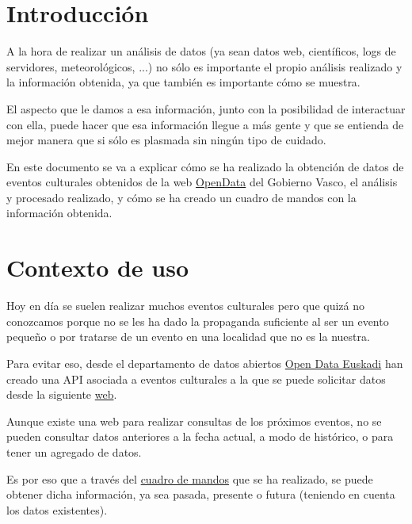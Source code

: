 \documentclass{\ClassPath/viu-tfm-template}
\begin{document}
    \graphicspath{{../../VIU_TFM_LaTeX_template/}}

    \coverpage

    \tableofcontents

\chapter{Introducción}

A la hora de realizar un análisis de datos (ya sean datos web, científicos, logs de servidores, meteorológicos, ...) no sólo es importante el propio análisis realizado y la información obtenida, ya que también es importante cómo se muestra.

El aspecto que le damos a esa información, junto con la posibilidad de interactuar con ella, puede hacer que esa información llegue a más gente y que se entienda de mejor manera que si sólo es plasmada sin ningún tipo de cuidado.

En este documento se va a explicar cómo se ha realizado la obtención de datos de eventos culturales obtenidos de la web \href{https://www.opendata.euskadi.eus/inicio/}{OpenData} del Gobierno Vasco, el análisis y procesado realizado, y cómo se ha creado un cuadro de mandos con la información obtenida.

\chapter{Contexto de uso}

Hoy en día se suelen realizar muchos eventos culturales pero que quizá no conozcamos porque no se les ha dado la propaganda suficiente al ser un evento pequeño o por tratarse de un evento en una localidad que no es la nuestra.

Para evitar eso, desde el departamento de datos abiertos \href{https://www.opendata.euskadi.eus/inicio/}{Open Data Euskadi} han creado una API asociada a eventos culturales a la que se puede solicitar datos desde la siguiente \href{https://www.opendata.euskadi.eus/api-culture/?api=culture_events}{web}.

Aunque existe una web para realizar consultas de los próximos eventos, no se pueden consultar datos anteriores a la fecha actual, a modo de histórico, o para tener un agregado de datos.

Es por eso que a través del \href{https://datastudio.google.com/reporting/2322c44e-ad75-4243-a4a5-257be6d754bf/page/9AT6C}{cuadro de mandos} que se ha realizado, se puede obtener dicha información, ya sea pasada, presente o futura (teniendo en cuenta los datos existentes).
\end{document}
